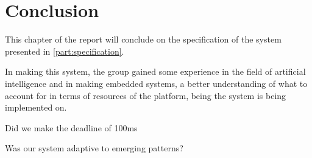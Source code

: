 \chapter{Conclusion}

This chapter of the report will conclude on the specification of the system presented in \cref{part:specification}.

In making this system, the group gained some experience in the field of artificial intelligence and in making embedded systems, a better understanding of what to account for in terms of resources of the platform, being the system is being implemented on.

Did we make the deadline of 100ms

Was our system adaptive to emerging patterns?
